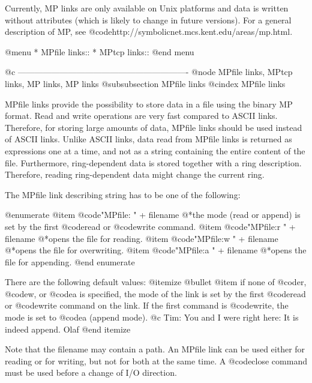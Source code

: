 {{{{{{Currently, MP links are only available on Unix platforms and data is
written without attributes (which is likely to change in future
versions). For a general description of MP, see
@code{http://symbolicnet.mcs.kent.edu/areas/mp.html}.

@menu
* MPfile links::
* MPtcp links::
@end menu

@c -------------------------------------------------------------
@node MPfile links, MPtcp links, MP links, MP links
@subsubsection MPfile links
@cindex MPfile links

MPfile links provide the possibility to store data in a file using the
binary MP format. Read and write operations are very fast compared to
ASCII links. Therefore, for storing large amounts of data, MPfile links
should be used instead of ASCII links. Unlike ASCII links, data read
from MPfile links is returned as expressions one at a time, and not as a
string containing the entire content of the file. Furthermore, ring-dependent
data is stored together with a ring description. Therefore,
reading ring-dependent data might change the current ring.

The MPfile link describing string has to be one of the following:

@enumerate
@item @code{"MPfile: "} + filename
@*the mode (read or append) is set by the first @code{read} or
@code{write} command.
@item @code{"MPfile:r "} + filename
@*opens the file for reading.
@item @code{"MPfile:w "} + filename
@*opens the file for overwriting.
@item @code{"MPfile:a "} + filename
@*opens the file for appending.
@end enumerate

There are the following default values:
@itemize @bullet
@item if none of @code{r}, @code{w}, or @code{a} is specified, the mode of
the link is set by the first @code{read} or @code{write} command on the
link. If the first command is @code{write}, the mode is set to @code{a}
(append mode).
@c Tim: You and I were right here: It is indeed append. Olaf
@end itemize

Note that the filename may contain a path. An MPfile link can be used
either for reading or for writing, but not for both at the same time. A
@code{close} command must be used before a change of I/O direction.

}}}}}}
